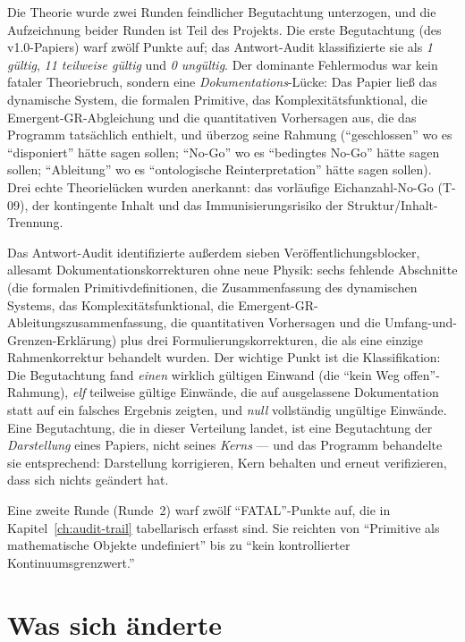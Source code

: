 \documentclass[10pt,twoside,openany]{book}
\begin{document}
Die Theorie wurde zwei Runden feindlicher Begutachtung unterzogen, und die Aufzeichnung
beider Runden ist Teil des Projekts. Die erste Begutachtung (des v1.0-Papiers) warf zwölf
Punkte auf; das Antwort-Audit klassifizierte sie als \emph{1 gültig}, \emph{11 teilweise
gültig} und \emph{0 ungültig}. Der dominante Fehlermodus war kein fataler Theoriebruch,
sondern eine \emph{Dokumentations}-Lücke: Das Papier ließ das dynamische System, die
formalen Primitive, das Komplexitätsfunktional, die Emergent-GR-Abgleichung und die
quantitativen Vorhersagen aus, die das Programm tatsächlich enthielt, und überzog seine
Rahmung (``geschlossen'' wo es ``disponiert'' hätte sagen sollen; ``No-Go'' wo es
``bedingtes No-Go'' hätte sagen sollen; ``Ableitung'' wo es ``ontologische
Reinterpretation'' hätte sagen sollen). Drei echte Theorielücken wurden anerkannt: das
vorläufige Eichanzahl-No-Go (T-09), der kontingente Inhalt und das Immunisierungsrisiko
der Struktur/Inhalt-Trennung.

Das Antwort-Audit identifizierte außerdem sieben Veröffentlichungsblocker, allesamt
Dokumentationskorrekturen ohne neue Physik: sechs fehlende Abschnitte (die formalen
Primitivdefinitionen, die Zusammenfassung des dynamischen Systems, das
Komplexitätsfunktional, die Emergent-GR-Ableitungszusammenfassung, die quantitativen
Vorhersagen und die Umfang-und-Grenzen-Erklärung) plus drei Formulierungskorrekturen, die
als eine einzige Rahmenkorrektur behandelt wurden. Der wichtige Punkt ist die
Klassifikation: Die Begutachtung fand \emph{einen} wirklich gültigen Einwand (die
``kein Weg offen''-Rahmung), \emph{elf} teilweise gültige Einwände, die auf ausgelassene
Dokumentation statt auf ein falsches Ergebnis zeigten, und \emph{null} vollständig
ungültige Einwände. Eine Begutachtung, die in dieser Verteilung landet, ist eine
Begutachtung der \emph{Darstellung} eines Papiers, nicht seines \emph{Kerns} --- und das
Programm behandelte sie entsprechend: Darstellung korrigieren, Kern behalten und erneut
verifizieren, dass sich nichts geändert hat.

Eine zweite Runde (Runde~2) warf zwölf ``FATAL''-Punkte auf, die in
Kapitel~\ref{ch:audit-trail} tabellarisch erfasst sind. Sie reichten von ``Primitive
als mathematische Objekte undefiniert'' bis zu ``kein kontrollierter
Kontinuumsgrenzwert.''

\section{Was sich änderte}
\end{document}
